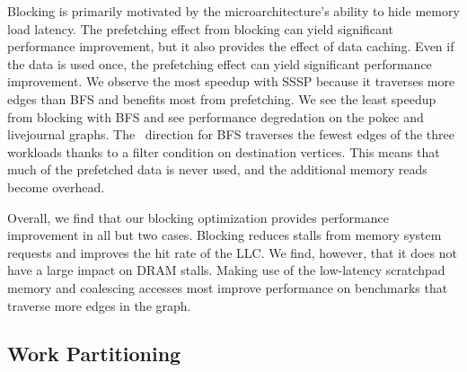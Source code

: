 Blocking is primarily motivated by the microarchitecture's ability to hide memory load latency.
The prefetching effect from blocking can yield significant performance improvement, but it also provides the effect of data caching.
Even if the data is used once, the prefetching effect can yield significant performance improvement. 
We observe the most speedup with SSSP because it traverses more edges than BFS and benefits most from prefetching.
We see the least speedup from blocking with BFS and see performance degredation on the pokec and livejournal graphs.
The \pull~direction for BFS traverses the fewest edges of the three workloads thanks to a filter condition on destination vertices.
This means that much of the prefetched data is never used, and the additional memory reads become overhead.

Overall, we find that our blocking optimization provides performance improvement in all but two cases. 
Blocking reduces stalls from memory system requests and improves the hit rate of the LLC. We find, however, that it does not have a large impact on DRAM stalls.
Making use of the low-latency scratchpad memory and coalescing accesses most improve performance on benchmarks that traverse more edges in the graph. 
 
\subsection{Work Partitioning}
 
 


